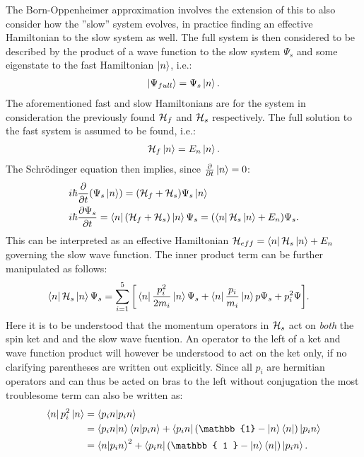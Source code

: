 \documentclass[a4paper]{article}
\begin{document}
The Born-Oppenheimer approximation involves the extension of this to also consider how the
''slow'' system evolves, in practice finding an effective Hamiltonian to the slow system as
well. The full system is then considered to be described by the product of a wave function to the slow
system \(\Psi_s\) and  some eigenstate to the fast Hamiltonian \(\ket{n}\), i.e.:
\begin{align*}
        \ket{\Psi_{full}} = \Psi_s\ket{n}
.\end{align*}
The aforementioned fast and slow Hamiltonians are for the system in consideration the
previously found \(\mathbb{\cal H}_f\) and \(\mathbb{\cal H}_s\) respectively. The full
solution to the fast system is assumed to be found, i.e.:
\begin{align*}
        \mathbb{\cal H}_f \ket{n} = E_n\ket{n}
.\end{align*}
The Schrödinger equation then implies, since \(\frac{\partial }{\partial t} \ket{n} = 0\):
\begin{align*}
        &i\hbar{}\frac{\partial }{\partial t} (\Psi_s\ket{n}) = (\mathbb{\cal H}_f +
        \mathbb{\cal H}_s) \Psi_s\ket{n}\\
        &i\hbar{}\frac{\partial \Psi_s}{\partial t} = \bra{n}(\mathbb{\cal H}_f +
        \mathbb{\cal H}_s)\ket{n}\Psi_s = (\bra{n}\mathbb{\cal H}_s\ket{n} +
        E_n)\Psi_s
.\end{align*}
This can be interpreted as an effective Hamiltonian \(\mathbb{\cal H}_{eff} =
\bra{n}\mathbb{\cal H}_s\ket{n} + E_n\) governing the slow wave function.
The inner product term can be further manipulated as follows:
\begin{align*}
        \bra{n} \mathbb{\cal H}_s \ket{n} \Psi_s &= \sum_{i=1}^{5} \bigg[\bra{n}
        \frac{p_i^2}{2m_i}\ket{n} \Psi_s + \bra{n} \frac{p_i}{m_i} \ket{n}
        p\Psi_s + p_i^2\Psi\bigg]
.\end{align*}
Here it is to be understood that the momentum operators in \(\mathbb{\cal H}_s\) act on
\textit{both} the spin ket and
and the slow wave fucntion. An operator to the left of a ket and wave function product will
however be understood to act on the ket only, if no clarifying parentheses are written out
explicitly.
Since all \(p_i\) are hermitian operators and can thus be acted on bras to the left
without conjugation the most troublesome term can also be
written as: %
\begin{align*}
        \bra{n} p_i^2\ket{n} &= \bra{p_i n} \ket{p_i n}\\
                                                 &=
                                                 \bra{p_i
                                                 n}\ket{n}\bra{n}\ket{p_i n}
                                                 + \bra{p_i n} (\mathbb{1} - \ket{n}
                                                 \bra{n}) \ket{p_i n}\\
                                                 &= \bra{n}\ket{p_i n}^2 +
                                                         \bra{p_i n} (\mathbb{ 1 } -
                                                         \ket{n}\bra{n})\ket{p_i
                                                         n}
.\end{align*}
\end{document}
